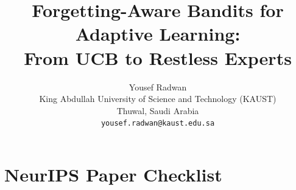 \documentclass{article}
\title{Forgetting-Aware Bandits for Adaptive Learning:\\From UCB to Restless Experts}
\author{
  Yousef Radwan \\
  King Abdullah University of Science and Technology (KAUST)\\
  Thuwal, Saudi Arabia \\
  \texttt{yousef.radwan@kaust.edu.sa}
}
\begin{document}
\maketitle











\newpage
\appendix


\newpage
\section*{NeurIPS Paper Checklist}
\end{document}

